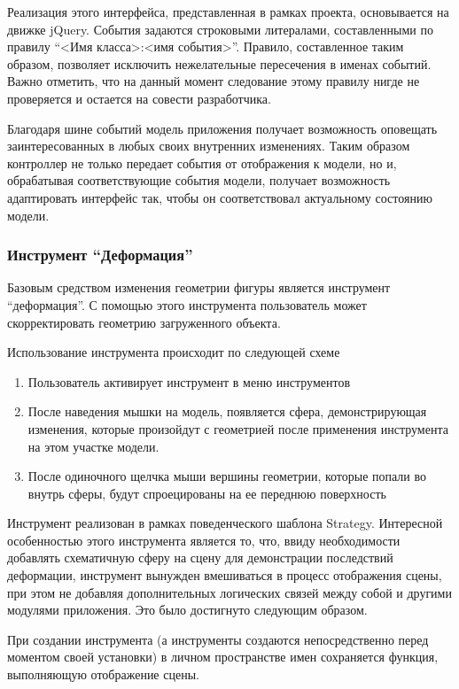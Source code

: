 \documentclass[12pt, a4paper]{article}
\begin{document}
Реализация этого интерфейса, представленная в рамках проекта, основывается на
движке jQuery. События задаются строковыми литералами, составленными по правилу
``<Имя класса>:<имя события>''. Правило, составленное таким образом, позволяет
исключить нежелательные пересечения в именах событий. Важно отметить, что на
данный момент следование этому правилу нигде не проверяется и остается на
совести разработчика.

Благодаря шине событий модель приложения получает возможность оповещать
заинтересованных в любых своих внутренних изменениях. Таким образом контроллер
не только передает события от отображения к модели, но и, обрабатывая
соответствующие события модели, получает возможность адаптировать интерфейс так,
чтобы он соответствовал актуальному состоянию модели.

\subsubsection{Инструмент ``Деформация''}

Базовым средством изменения геометрии фигуры является инструмент ``деформация''.
С помощью этого инструмента пользователь может скорректировать геометрию
загруженного объекта.

Использование инструмента происходит по следующей схеме

\begin{enumerate}
    \item Пользователь активирует инструмент в меню инструментов
    \item После наведения мышки на модель, появляется сфера, демонстрирующая
    изменения, которые произойдут с геометрией после применения инструмента на
    этом участке модели.
    \item После одиночного щелчка мыши вершины геометрии, которые попали во
    внутрь сферы, будут спроецированы на ее переднюю поверхность
\end{enumerate}

Инструмент реализован в рамках поведенческого шаблона Strategy. Интересной
особенностью этого инструмента является то, что, ввиду необходимости добавлять
схематичную сферу на сцену для демонстрации последствий деформации, инструмент
вынужден вмешиваться в процесс отображения сцены, при этом не добавляя
дополнительных логических связей между собой и другими модулями приложения. Это
было достигнуто следующим образом.

При создании инструмента (а инструменты создаются непосредственно перед моментом
своей установки) в личном пространстве имен сохраняется функция,
выполняющую отображение сцены.
\end{document}
